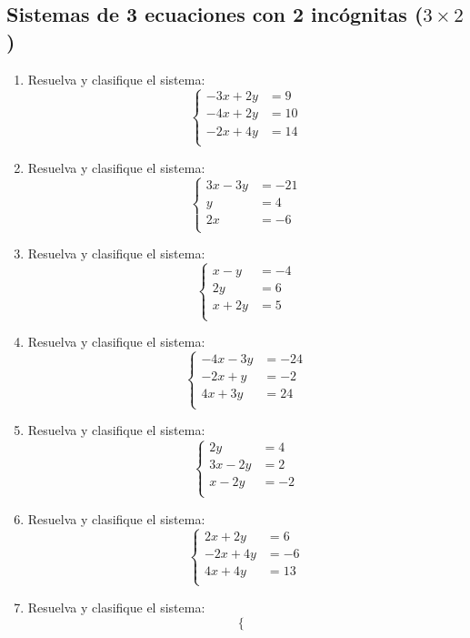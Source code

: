 \documentclass[11pt]{article}
\begin{document}
\subsection{Sistemas de 3 ecuaciones con 2 incógnitas ($ 3\times 2 $)}
\begin{enumerate}
\item Resuelva y clasifique el sistema:
\[
\left\{\begin{aligned}
-3x+2y&=9\\
-4x+2y&=10\\
-2x+4y&=14\\
\end{aligned}\right.
\]
\item Resuelva y clasifique el sistema:
\[
\left\{\begin{aligned}
3x-3y&=-21\\
y&=4\\
2x&=-6\\
\end{aligned}\right.
\]
\item Resuelva y clasifique el sistema:
\[
\left\{\begin{aligned}
x-y&=-4\\
2y&=6\\
x+2y&=5\\
\end{aligned}\right.
\]
\item Resuelva y clasifique el sistema:
\[
\left\{\begin{aligned}
-4x-3y&=-24\\
-2x+y&=-2\\
4x+3y&=24\\
\end{aligned}\right.
\]
\item Resuelva y clasifique el sistema:
\[
\left\{\begin{aligned}
2y&=4\\
3x-2y&=2\\
x-2y&=-2\\
\end{aligned}\right.
\]
\item Resuelva y clasifique el sistema:
\[
\left\{\begin{aligned}
2x+2y&=6\\
-2x+4y&=-6\\
4x+4y&=13\\
\end{aligned}\right.
\]
\item Resuelva y clasifique el sistema:
\[
\left\{\begin{aligned}

\end{aligned}\]
\end{enumerate}
\end{document}
